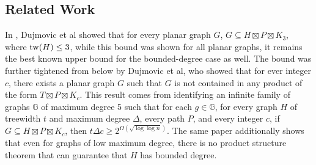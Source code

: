 \documentclass[../main.tex]{subfiles}
\begin{document}
	\subsection{Related Work}
	In \cite{DJMMUW20}, Dujmovic et al showed that for every planar graph $G$, $G\subseteq H\boxtimes P\boxtimes K_3$, where $\operatorname{tw}(H) \le 3$, while this bound was shown for all planar graphs, it remains the best known upper bound for the bounded-degree case as well. The bound was further tightened from below by Dujmovic et al, who showed that for ever integer $c$, there exists a planar graph $G$ such that $G$ is not contained in any product of the form $T\boxtimes P\boxtimes K_c$\cite{DJMMW24}.  
	This result comes from identifying an infinite family of graphs $\mathbb{G}$ of maximum degree 5 such that for each $g\in\mathbb{G}$, for every graph $H$ of treewidth $t$ and maximum degree $\Delta$, every path $P$, and every integer $c$, if $G\subseteq H \boxtimes P\boxtimes K_c$, then $t\Delta c\ge 2^{\Omega(\sqrt{\log\log n})}$.
	The same paper additionally shows that even for graphs of low maximum degree, there is no product structure theorem that can guarantee that $H$ has bounded degree. 
	
	
	
	
\end{document}
